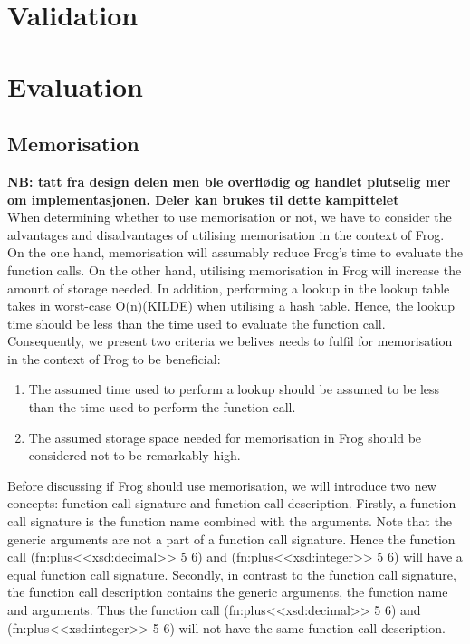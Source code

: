 \section{Validation}
\label{implValidation}

\section{Evaluation}
\label{implementation_evaluation}

\subsection{Memorisation}
\textbf{NB: tatt fra design delen men ble overflødig og handlet plutselig mer om implementasjonen. Deler kan brukes til dette kampittelet}
\\
When determining whether to use memorisation or not, we have to consider the advantages and disadvantages of utilising memorisation in the context of Frog. On the one hand, memorisation will assumably reduce Frog's time to evaluate the function calls. On the other hand, utilising memorisation in Frog will increase the amount of storage needed. In addition, performing a lookup in the lookup table takes in worst-case O(n)(KILDE) when utilising a hash table. Hence, the lookup time should be less than the time used to evaluate the function call. Consequently, we present two criteria we belives needs to fulfil for memorisation in the context of Frog to be beneficial:
\begin{enumerate}
    \item The assumed time used to perform a lookup should be assumed to be less than the time used to perform the function call.
    \item The assumed storage space needed for memorisation in Frog should be considered not to be remarkably high. 
\end{enumerate}

\para 
Before discussing if Frog should use memorisation, we will introduce two new concepts: function call signature and function call description. 
Firstly, a function call signature is the function name combined with the arguments. Note that the generic arguments are not a part of a function call signature. Hence the function call (fn:plus<<xsd:decimal>> 5 6) and (fn:plus<<xsd:integer>> 5 6) will have a equal function call signature. Secondly, in contrast to the function call signature, the function call description contains the generic arguments, the function name and arguments. Thus the function call (fn:plus<<xsd:decimal>> 5 6) and (fn:plus<<xsd:integer>> 5 6) will not have the same function call description.

